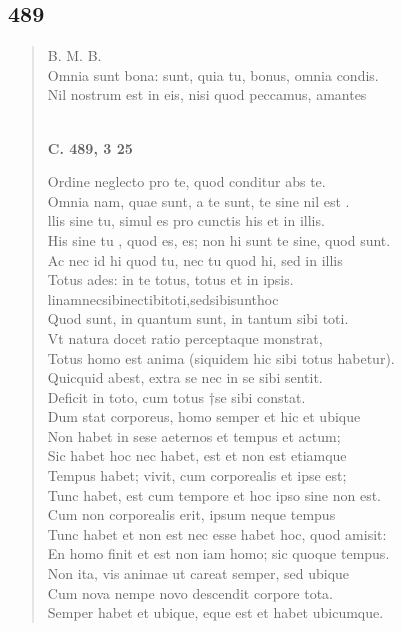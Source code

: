\documentclass[11pt, a4paper]{report}
\begin{document}
            \subsection*{489}
      \begin{verse}
      B. M. B. \\ Omnia sunt bona: sunt, quia tu, bonus, omnia condis. \\ Nil nostrum est in eis, nisi quod peccamus, amantes \\ 
        ﻿\pagebreak 
    \begin{center} \textbf{C. 489, 3 25} \end{center}Ordine neglecto pro te, quod conditur abs te. \\ Omnia nam, quae sunt, a te sunt, te sine nil  \lbrack est \rbrack . \\ llis sine tu, simul es pro cunctis his et in illis. \\ His sine  \lbrack tu \rbrack , quod es, es; non hi sunt te sine, quod sunt. \\ Ac nec id hi quod tu, nec tu quod hi, sed in illis \\ Totus ades: in te totus, totus et in ipsis. \\ linamnecsibinectibitoti,sedsibisunthoc \\ Quod sunt, in quantum sunt, in tantum sibi toti. \\ Vt natura docet ratio perceptaque monstrat, \\ Totus homo est anima (siquidem hic sibi totus habetur). \\ Quicquid abest, extra se nec in se sibi sentit. \\ Deficit in toto, cum totus †se sibi constat. \\ Dum stat corporeus, homo semper et hic et ubique \\ Non habet in sese aeternos et tempus et actum; \\ Sic habet hoc nec habet, est et non est etiamque \\ Tempus habet; vivit, cum corporealis et ipse est; \\ Tunc habet, est cum tempore et hoc ipso sine non est. \\ Cum non corporealis erit, ipsum neque tempus \\ Tunc habet et non est nec esse habet hoc, quod amisit: \\ En homo finit et est non iam homo; sic quoque tempus. \\ Non ita, vis animae ut careat semper, sed ubique \\ Cum nova nempe novo descendit corpore tota. \\ Semper habet et ubique, eque est et habet ubicumque. \\ 

\end{verse}
\end{document}
